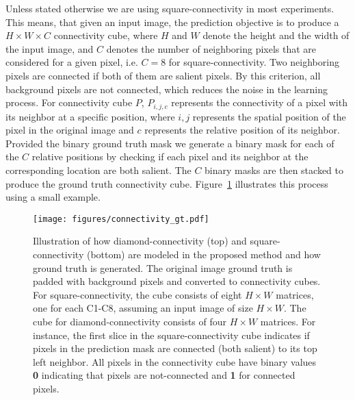 \documentclass[journal]{IEEEtran}
\begin{document}
Unless stated otherwise we are using square-connectivity in most experiments. This means, that given an input image, the prediction objective is to produce a $H\times W \times C$ connectivity cube, where $H$ and $W$ denote the height and the width of the input image, and $C$ denotes the number of neighboring pixels that are considered for a given pixel, i.e. $C = 8$ for square-connectivity. Two neighboring pixels are connected if both of them are salient pixels. By this criterion, all background pixels are not connected, which reduces the noise in the learning process. For connectivity cube $P$, $P_{i,j,c}$ represents the connectivity of a pixel with its neighbor at a specific position, where $i,j$ represents the spatial position of the pixel in the original image and $c$ represents the relative position of its neighbor. Provided the binary ground truth mask we generate a binary mask for each of the $C$ relative positions by checking if each pixel and its neighbor at the corresponding location are both salient. The $C$ binary masks are then stacked to produce the ground truth connectivity cube.
Figure~\ref{fig:conn_illustration} illustrates this process using a small example.

\begin{figure}[t]
\begin{center}
\texttt{[image: figures/connectivity\_gt.pdf]}
\end{center}
   \caption{Illustration of how diamond-connectivity (top) and square-connectivity (bottom) are modeled in the proposed method and how ground truth is generated. 
   The original image ground truth is padded with background pixels and converted to connectivity cubes. For square-connectivity, the cube consists of eight $H\times W$ matrices, one for each C1-C8, assuming an input image of size $H\times W$. The cube for diamond-connectivity consists of four $H\times W$ matrices. For instance, the first slice in the square-connectivity cube indicates if pixels in the prediction mask are connected (both salient) to its top left neighbor. All pixels in the connectivity cube have binary values \textbf{0} indicating that pixels are not-connected and \textbf{1} for connected pixels.}
\label{fig:conn_illustration}
\end{figure}
\end{document}
